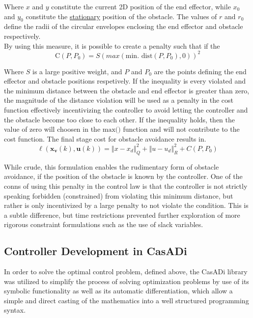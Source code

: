 \documentclass[journal]{IEEEtran}
\begin{document}
Where $x$ and $y$ constitute the current 2D position of the end effector, while $x_0$ and $y_0$ constitute the \underline{stationary} position of the obstacle. The values of $r$ and $r_0$ define the radii of the circular envelopes enclosing the end effector and obstacle respectively. \\

By using this measure, it is possible to create a penalty such that if the
\begin{equation}
\text{C}(P,P_0) = S(max(\text{min. dist}(P, P_0), 0))^2
\end{equation}

Where $S$ is a large positive weight, and $P$ and $P_0$ are the points defining the end effector and obstacle positions respetively. If the inequality is every violated and the minimum distance between the obstacle and end effector is greater than zero, the magnitude of the distance violation will be used as a penalty in the cost function effectively incentivizing the controller to avoid letting the controller and the obstacle become too close to each other. If the inequality holds, then the value of zero will choosen in the $\text{max()}$ function and will not contribute to the cost function. The final stage cost for obstacle avoidance results in. \\
\begin{equation}
  \ell\left(\mathbf{x}_{\mathbf{v}}(k), \mathbf{u}(k)\right) = \left\Vert x - x_d \right\Vert^{2}_{Q} + \left\Vert u -u_d \right\Vert^{2}_{R} + C(P,P_0)
\end{equation}

While crude, this formulation enables the rudimentary form of obstacle avoidance, if the position of the obstacle is known by the controller. One of the conns of using this penalty in the control law is that the controller is not strictly speaking forbidden (constrained) from violating this minimum distance, but rather is only incentivized by a large penalty to not violate the condition. This is a subtle difference, but time restrictions prevented further exploration of more rigorous constraint formulations such as the use of slack variables. \cite{soft_constraints}

\subsection{Controller Development in CasADi}
In order to solve the optimal control problem, defined above, the CasADi library was utilized to simplify the process of solving optimization problems by use of its symbolic functionality as well as its automatic differentiation, which allow a simple and direct casting of the mathematics into a well structured programming syntax. \\
\end{document}
